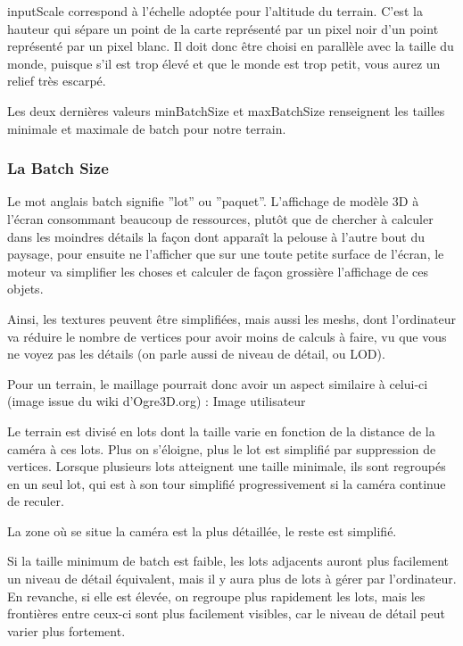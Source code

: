 inputScale correspond à l'échelle adoptée pour l'altitude du terrain. C'est la hauteur qui sépare un point de la carte représenté par un pixel noir d'un point représenté par un pixel blanc. Il doit donc être choisi en parallèle avec la taille du monde, puisque s'il est trop élevé et que le monde est trop petit, vous aurez un relief très escarpé.

Les deux dernières valeurs minBatchSize  et maxBatchSize  renseignent les tailles minimale et maximale de batch pour notre terrain.



\subsubsection{La Batch Size}


Le mot anglais batch signifie ''lot'' ou ''paquet''. L'affichage de modèle 3D à l'écran consommant beaucoup de ressources, plutôt que de chercher à calculer dans les moindres détails la façon dont apparaît la pelouse à l'autre bout du paysage, pour ensuite ne l'afficher que sur une toute petite surface de l'écran, le moteur va simplifier les choses et calculer de façon grossière l'affichage de ces objets.

Ainsi, les textures peuvent être simplifiées, mais aussi les meshs, dont l'ordinateur va réduire le nombre de vertices pour avoir moins de calculs à faire, vu que vous ne voyez pas les détails (on parle aussi de niveau de détail, ou LOD).

Pour un terrain, le maillage pourrait donc avoir un aspect similaire à celui-ci (image issue du wiki d'Ogre3D.org) :
Image utilisateur

Le terrain est divisé en lots dont la taille varie en fonction de la distance de la caméra à ces lots. Plus on s'éloigne, plus le lot est simplifié par suppression de vertices. Lorsque plusieurs lots atteignent une taille minimale, ils sont regroupés en un seul lot, qui est à son tour simplifié progressivement si la caméra continue de reculer.

La zone où se situe la caméra est la plus détaillée, le reste est simplifié.

Si la taille minimum de batch est faible, les lots adjacents auront plus facilement un niveau de détail équivalent, mais il y aura plus de lots à gérer par l'ordinateur. En revanche, si elle est élevée, on regroupe plus rapidement les lots, mais les frontières entre ceux-ci sont plus facilement visibles, car le niveau de détail peut varier plus fortement.

